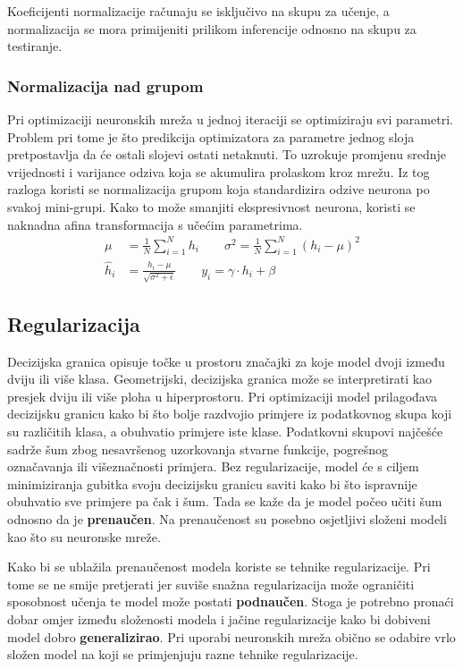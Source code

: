 \documentclass[times, utf8, numeric, diplomski]{fer}
\begin{document}
Koeficijenti normalizacije računaju se isključivo na skupu za učenje, a normalizacija se mora primijeniti prilikom inferencije odnosno na skupu za testiranje.

\subsubsection{Normalizacija nad grupom}

Pri optimizaciji neuronskih mreža u jednoj iteraciji se optimiziraju svi parametri. Problem pri tome je što predikcija optimizatora za parametre jednog sloja pretpostavlja da će ostali slojevi ostati netaknuti. To uzrokuje promjenu srednje vrijednosti i varijance odziva koja se akumulira prolaskom kroz mrežu. Iz tog razloga koristi se normalizacija grupom koja standardizira odzive neurona po svakoj mini-grupi. Kako to može smanjiti ekspresivnost neurona, koristi se naknadna afina transformacija s učećim parametrima.
\begin{align}
\mu &= \frac{1}{N} \sum_{i=1}^N h_i \qquad
\sigma^2 = \frac{1}{N} \sum_{i=1}^N (h_i-\mu)^2 \\
\hat{h}_i &= \frac{h_i - \mu}{\sqrt{\sigma^2 + \epsilon}} \qquad
y_i = \gamma \cdot h_i + \beta
\end{align}

\subsection{Regularizacija}
\label{sec:regularizacija}
Decizijska granica opisuje točke u prostoru značajki za koje model dvoji između dviju ili više klasa. Geometrijski, decizijska granica može se interpretirati kao presjek dviju ili više ploha u hiperprostoru. Pri optimizaciji model prilagođava decizijsku granicu kako bi što bolje razdvojio primjere iz podatkovnog skupa koji su različitih klasa, a obuhvatio primjere iste klase. Podatkovni skupovi najčešće sadrže šum zbog nesavršenog uzorkovanja stvarne funkcije, pogrešnog označavanja ili višeznačnosti primjera. Bez regularizacije, model će s ciljem minimiziranja gubitka svoju decizijsku granicu saviti kako bi što ispravnije obuhvatio sve primjere pa čak i šum. Tada se kaže da je model počeo učiti šum odnosno da je \textbf{prenaučen}. Na prenaučenost su posebno osjetljivi složeni modeli kao što su neuronske mreže.

Kako bi se ublažila prenaučenost modela koriste se tehnike regularizacije. Pri tome se ne smije pretjerati jer suviše snažna regularizacija može ograničiti sposobnost učenja te model može postati \textbf{podnaučen}. Stoga je potrebno pronaći dobar omjer između složenosti modela i jačine regularizacije kako bi dobiveni model dobro \textbf{generalizirao}. Pri uporabi neuronskih mreža obično se odabire vrlo složen model na koji se primjenjuju razne tehnike regularizacije.
\end{document}
